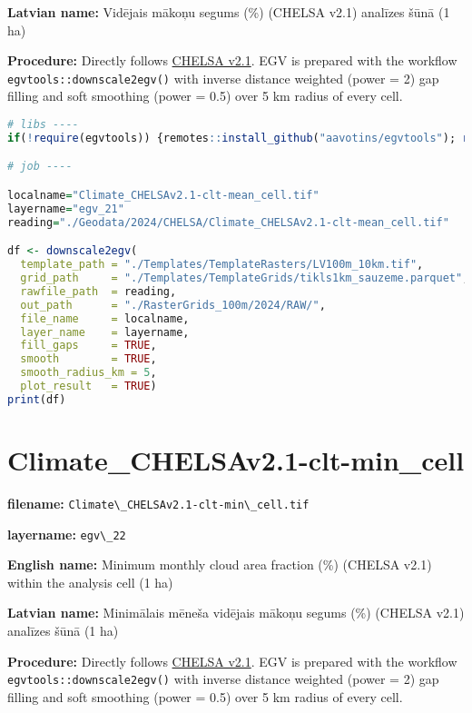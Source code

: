 \documentclass[
]{book}
\newcommand{\passthrough}[1]{#1}
\begin{document}
\textbf{Latvian name:} Vidējais mākoņu segums (\%) (CHELSA v2.1) analīzes šūnā (1 ha)

\textbf{Procedure:} Directly follows \hyperref[Ch04.11]{CHELSA v2.1}. EGV is prepared with the
workflow \passthrough{\lstinline!egvtools::downscale2egv()!} with inverse distance weighted (power = 2)
gap filling and soft smoothing (power = 0.5) over 5 km radius of every cell.

\begin{lstlisting}[language=R]
# libs ----
if(!require(egvtools)) {remotes::install_github("aavotins/egvtools"); require(egvtools)}

# job ----

localname="Climate_CHELSAv2.1-clt-mean_cell.tif"
layername="egv_21"
reading="./Geodata/2024/CHELSA/Climate_CHELSAv2.1-clt-mean_cell.tif"

df <- downscale2egv(
  template_path = "./Templates/TemplateRasters/LV100m_10km.tif",
  grid_path     = "./Templates/TemplateGrids/tikls1km_sauzeme.parquet",
  rawfile_path  = reading,
  out_path      = "./RasterGrids_100m/2024/RAW/",
  file_name     = localname,
  layer_name    = layername,
  fill_gaps     = TRUE,
  smooth        = TRUE,
  smooth_radius_km = 5,
  plot_result   = TRUE)
print(df)
\end{lstlisting}

\section{Climate\_CHELSAv2.1-clt-min\_cell}\label{ch06.022}

\textbf{filename:} \passthrough{\lstinline!Climate\_CHELSAv2.1-clt-min\_cell.tif!}

\textbf{layername:} \passthrough{\lstinline!egv\_22!}

\textbf{English name:} Minimum monthly cloud area fraction (\%) (CHELSA v2.1) within the analysis cell (1 ha)

\textbf{Latvian name:} Minimālais mēneša vidējais mākoņu segums (\%) (CHELSA v2.1) analīzes šūnā (1 ha)

\textbf{Procedure:} Directly follows \hyperref[Ch04.11]{CHELSA v2.1}. EGV is prepared with the
workflow \passthrough{\lstinline!egvtools::downscale2egv()!} with inverse distance weighted (power = 2)
gap filling and soft smoothing (power = 0.5) over 5 km radius of every cell.
\end{document}

